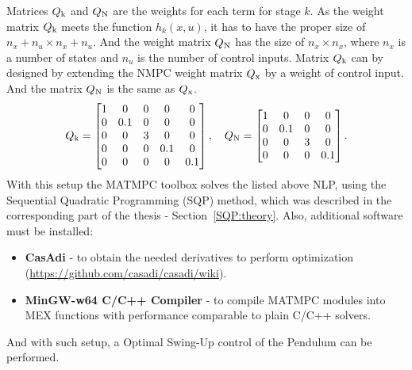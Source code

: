 Matrices $Q _{\text{k}}$ and $Q _{\text{N}}$ are the weights for each term for stage $k$. As the weight matrix $Q _{\text{k}}$ meets the function $h_k(x, u)$, it has to have the proper size of $n_x+n_u\times n_x+n_u$. And the weight matrix $Q _{\text{N}}$ has the size of $n_x\times n_x$, where $n_x$ is a number of states and $n_u$ is the number of control inputs. Matrix $Q _{\text{k}}$ can by designed by extending the NMPC weight matrix $Q _{\text{x}}$ by a weight of control input. And the matrix $Q _{\text{N}}$ is the same as $Q _{\text{x}}$.
\begin{equation}\label{NLP:weights}
Q _{\text{k}} = \begin{bmatrix}
				1&0&0&0&0\\
				0&0.1&0&0&0\\
				0&0&3&0&0\\
				0&0&0&0.1&0\\
				0&0&0&0&0.1
			\end{bmatrix}, \quad 
Q _{\text{N}} = \begin{bmatrix}
				1&0&0&0\\
				0&0.1&0&0\\
				0&0&3&0\\
				0&0&0&0.1
			\end{bmatrix}.
\end{equation}
With this setup the \textsc{MATMPC} toolbox solves the listed above NLP, using the Sequential Quadratic Programming (SQP) method, which was described in the corresponding part of the thesis - Section~\ref{SQP:theory}. Also, additional software must be installed:
\begin{itemize}
	\item \textbf{CasAdi} - to obtain the needed derivatives to perform optimization (\url{https://github.com/casadi/casadi/wiki}).
	\item \textbf{MinGW-w64 C/C++ Compiler} - to compile \textsc{MATMPC} modules into MEX functions with performance comparable to plain C/C++ solvers.
\end{itemize}
And with such setup, a Optimal Swing-Up control of the Pendulum can be performed.
\newpage
